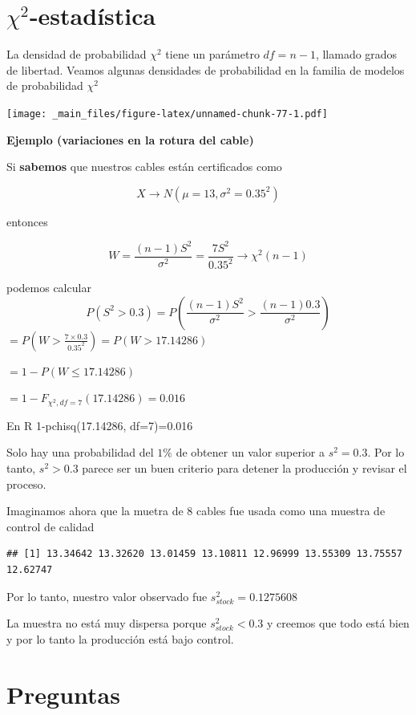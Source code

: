 \documentclass[
]{book}
\begin{document}
\hypertarget{chi2-estaduxedstica}{%
\section{\texorpdfstring{\(\chi^2\)-estadística}{\textbackslash chi\^{}2-estadística}}\label{chi2-estaduxedstica}}

La densidad de probabilidad \(\chi^2\) tiene un parámetro \(df=n-1\), llamado grados de libertad. Veamos algunas densidades de probabilidad en la familia de modelos de probabilidad \(\chi^2\)

\texttt{[image: \_main\_files/figure-latex/unnamed-chunk-77-1.pdf]}

\textbf{Ejemplo (variaciones en la rotura del cable)}

Si \textbf{sabemos} que nuestros cables están certificados como

\[X \rightarrow N(\mu=13, \sigma^2=0.35^2)\]

entonces

\[W=\frac{(n-1)S^2}{\sigma^2}= \frac{7S^2}{0.35^2} \rightarrow \chi^2(n-1)\]

podemos calcular \[P(S^2 > 0.3)=P(\frac{(n-1)S^2}{\sigma^2} > \frac{(n-1)0.3}{\sigma^2 })\]
\(=P(W > \frac{7\times0.3}{0.35^2})=P(W > 17.14286)\)

\(=1-P(W \leq 17.14286)\)

\(= 1- F_{\chi^2,df=7}(17.14286)=0.016\)

En R
1-pchisq(17.14286, df=7)=0.016

Solo hay una probabilidad del \(1\%\) de obtener un valor superior a \(s^2=0.3\). Por lo tanto, \(s^2>0.3\) parece ser un buen criterio para detener la producción y revisar el proceso.

Imaginamos ahora que la muetra de \(8\) cables fue usada como una muestra de control de calidad

\begin{verbatim}
## [1] 13.34642 13.32620 13.01459 13.10811 12.96999 13.55309 13.75557 12.62747
\end{verbatim}

Por lo tanto, nuestro valor observado fue \(s^2_{stock}=0.1275608\)

La muestra no está muy dispersa porque \(s^2_{stock} < 0.3\) y creemos que todo está bien y por lo tanto la producción está bajo control.

\hypertarget{preguntas-7}{%
\section{Preguntas}\label{preguntas-7}}
\end{document}
